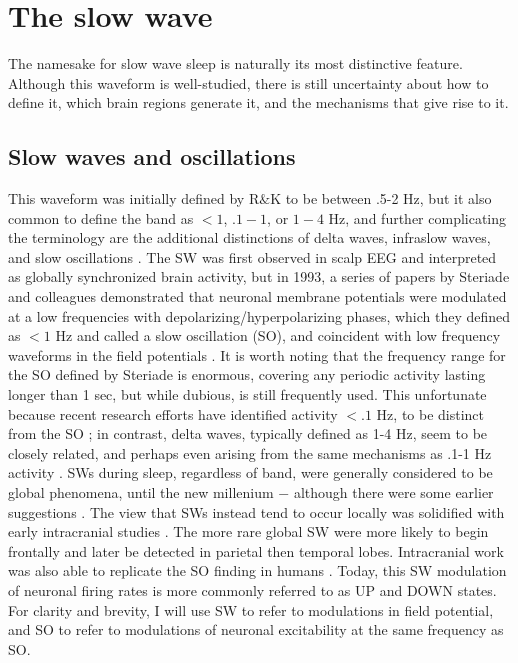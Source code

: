 \section*{The slow wave}
The namesake for slow wave sleep is naturally its most distinctive feature. Although this waveform is well-studied, there is still uncertainty about how to define it, which brain regions generate it, and the mechanisms that give rise to it. 

\subsection{Slow waves and oscillations}
This waveform was initially defined by R$\&$K to be between .5-2 Hz, but it also common to define the band as $<1$, $.1-1$, or $1-4$ Hz, and further complicating the terminology are the additional distinctions of delta waves, infraslow waves, and slow oscillations \citep{Amzica1995a, Vyazovskiy2013,Crunelli2010, Crunelli2018}. The SW was first observed in scalp EEG and interpreted as globally synchronized brain activity, but in 1993, a series of papers by Steriade and colleagues demonstrated that neuronal membrane potentials were modulated at a low frequencies with depolarizing/hyperpolarizing phases, which they defined as $<1$ Hz and called a slow oscillation (SO), and coincident with low frequency waveforms in the field potentials \citep{Steriade1993,Steriade1993a,Steriade1993b}. It is worth noting that the frequency range for the SO defined by Steriade is enormous, covering any periodic activity lasting longer than 1 sec, but while dubious, is still frequently used. This unfortunate because recent research efforts have identified activity $<.1$ Hz, to be distinct from the SO \citep{Mitra2014, Schwalm2017, Lecci2017,Piantoni2017}; in contrast, delta waves, typically defined as 1-4 Hz, seem to be closely related, and perhaps even arising from the same mechanisms as .1-1 Hz activity \citep{Crunelli2018}. SWs during sleep, regardless of band, were generally considered to be global phenomena, until the new millenium $-$ although there were some earlier suggestions \citep{Mukhametov1977,WERTH1997,Finelli2001}. The view that SWs instead tend to occur locally was solidified with early intracranial studies \citep{Cash2009,Nir2011}. The more rare global SW were more likely to begin frontally and later be detected in parietal then temporal lobes. Intracranial work was also able to replicate the SO finding in humans \citep{Cash2009}. Today, this SW modulation of neuronal firing rates is more commonly referred to as UP and DOWN states\citep{Sanchez-Vives2000, Cash2009}. For clarity and brevity, I will use SW to refer to modulations in field potential, and SO to refer to modulations of neuronal excitability at the same frequency as SO.

